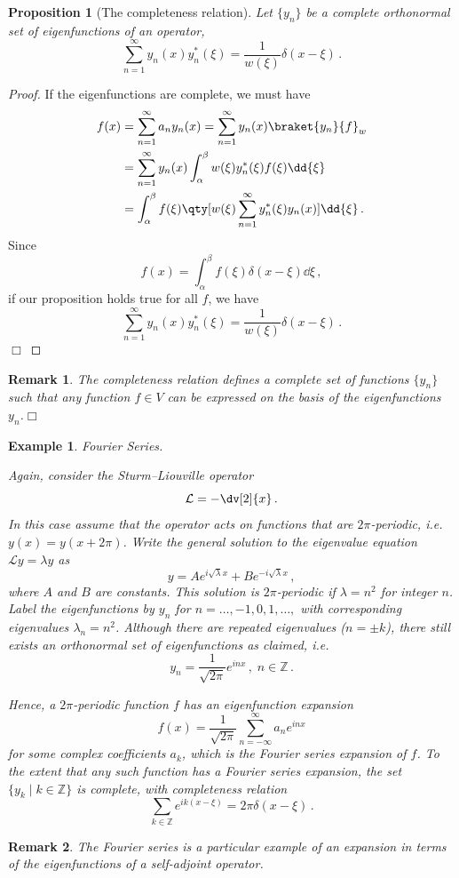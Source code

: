 \documentclass{article}
\theoremstyle{plain}\theoremheaderfont{\normalfont\itshape}\theorembodyfont{\rmfamily}\theoremseparator{.}\newtheorem*{rem}{Remark}\newtheorem*{ex}{Example}\newtheorem*{proof}{Proof}\newtheorem*{altp}{Alternative proof}
\theoremstyle{plain}\theoremheaderfont{\normalfont\bfseries}\theorembodyfont{\rmfamily}\theoremseparator{.}\newtheorem{thm}{Theorem}[section]\newtheorem{lem}[thm]{Lemma}\newtheorem{prop}[thm]{Proposition}\newtheorem*{cor}{Corollary}\newtheorem{defn}[thm]{Definition}\newtheorem{clm}[thm]{Claim}\newtheorem{clminproof}{Claim}
\theoremstyle{break}\theoremheaderfont{\normalfont\itshape}\theorembodyfont{\rmfamily}\theoremseparator{.\medskip}\newtheorem*{proofskip}{Proof}\newtheorem*{exs}{Examples}\newtheorem*{rems}{Remarks}
\theoremstyle{break}\theoremheaderfont{\normalfont\bfseries}\theorembodyfont{\rmfamily}\theoremseparator{.\medskip}\newtheorem{lemskip}[thm]{Lemma}\newtheorem{defnskip}[thm]{Definition}\newtheorem{propskip}[thm]{Proposition}\newtheorem{thmskip}[thm]{Theorem}
\numberwithin{equation}{section}
\newcommand{\qed}{\hfill\ensuremath{\Box}}
\begin{document}
	\begin{prop}[The completeness relation]
		Let \(\{y_n\}\) be a complete orthonormal set of eigenfunctions of an operator,
		\[\sum_{n=1}^{\infty}y_n(x)y_n^*(\xi)=\frac{1}{w(\xi)}\delta(x-\xi)\,.\]
	\end{prop}
	\begin{proof}
		If the eigenfunctions are complete, we must have
		\begin{align*}
			f(x)&=\sum_{n=1}^{\infty}a_ny_n(x)=\sum_{n=1}^{\infty}y_n(x)\braket{y_n}{f}_w\\
			&=\sum_{n=1}^{\infty}y_n(x)\int_{\alpha}^{\beta}w(\xi)y_n^*(\xi)f(\xi)\dd{\xi}\\
			&=\int_{\alpha}^{\beta}f(\xi)\qty[w(\xi)\sum_{n=1}^{\infty}y_n^*(\xi)y_n(x)]\dd{\xi}\,.
		\end{align*}
		Since
		\[f(x)=\int_{\alpha}^{\beta}f(\xi)\delta(x-\xi)\dd{\xi}\,,\]
		if our proposition holds true for all \(f\), we have
		\[\sum_{n=1}^{\infty}y_n(x)y_n^*(\xi)=\frac{1}{w(\xi)}\delta(x-\xi)\,.\]\qed
	\end{proof}
	\begin{rem}
		The completeness relation defines a complete set of functions \(\{y_n\}\) such that any function \(f\in V\) can be expressed on the basis of the eigenfunctions \(y_n\).\qed
	\end{rem}

	\begin{ex}
		\textit{Fourier Series.}
		
		Again, consider the Sturm--Liouville operator
		\[\mathcal{L}=-\dv[2]{x}\,.\]
		In this case assume that the operator acts on functions that are \(2\pi\)-periodic, i.e. \(y(x)=y(x+2\pi)\). Write the general solution to the eigenvalue equation \(\mathcal{L}y=\lambda y\) as
		\[y=Ae^{i\sqrt{\lambda}x}+Be^{-i\sqrt{\lambda}x}\,,\]
		where \(A\) and \(B\) are constants. This solution is \(2\pi\)-periodic if \(\lambda=n^2\) for integer \(n\). Label the eigenfunctions by \(y_n\) for \(n=\dots,-1,0,1,\dots,\) with corresponding eigenvalues \(\lambda_n=n^2\). Although there are repeated eigenvalues (\(n=\pm k\)), there still exists an orthonormal set of eigenfunctions as claimed, i.e.
		\[y_n=\frac{1}{\sqrt{2\pi}}e^{inx}\,,\;n\in\mathbb{Z}\,.\]

		Hence, a \(2\pi\)-periodic function \(f\) has an eigenfunction expansion
		\[f(x)=\frac{1}{\sqrt{2\pi}}\sum_{n=-\infty}^{\infty}a_ne^{inx}\]
		for some complex coefficients \(a_k\), which is the Fourier series expansion of \(f\). To the extent that any such function has a Fourier series expansion, the set \(\{ y_k\mid k\in\mathbb{Z}\}\) is complete, with completeness relation
		\[\sum_{k\in\mathbb{Z}}e^{ik(x-\xi)}=2\pi\delta(x-\xi)\,.\]
	\end{ex}
	\begin{rem}
		The Fourier series is a particular example of an expansion in terms of the eigenfunctions of a self-adjoint operator.
	\end{rem}
		
\end{document}

